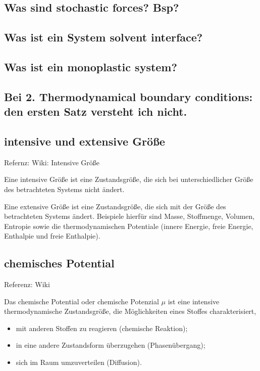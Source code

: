 \documentclass[]{article}
\begin{document}
\subsection{Was sind stochastic forces? Bsp?}

\subsection{Was ist ein System solvent interface?}

\subsection{Was ist ein monoplastic system?}

\subsection{Bei 2. Thermodynamical boundary conditions: den ersten Satz versteht ich nicht.}

\subsection{intensive und extensive Größe}
Refernz: Wiki: Intensive Größe

Eine intensive Größe ist eine Zustandsgröße, die sich bei unterschiedlicher Größe des betrachteten Systems nicht ändert.

Eine extensive Größe ist eine Zustandsgröße, die sich mit der Größe des betrachteten Systems ändert. Beispiele hierfür sind Masse, Stoffmenge, Volumen, Entropie sowie die thermodynamischen Potentiale (innere Energie, freie Energie, Enthalpie und freie Enthalpie). 

\subsection{chemisches Potential}
Referenz: Wiki

Das chemische Potential oder chemische Potenzial $\mu$ ist eine intensive thermodynamische Zustandsgröße, die Möglichkeiten eines Stoffes charakterisiert,
\begin{itemize}
	\item mit anderen Stoffen zu reagieren (chemische Reaktion);
	\item in eine andere Zustandsform überzugehen (Phasenübergang);
	\item sich im Raum umzuverteilen (Diffusion).
	\end{itemize}
	
\end{document}
